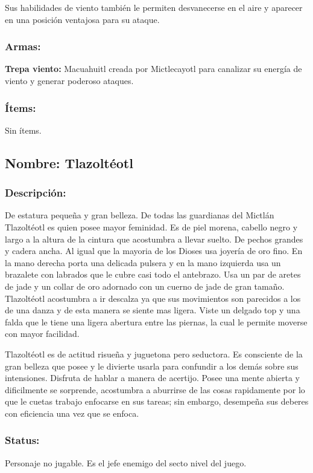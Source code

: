 \documentclass[11pt,letterpaper]{article}
\begin{document}
Sus habilidades de viento también le permiten desvanecerse en el aire y aparecer en una posición ventajosa para su ataque.
\subsubsection{Armas:}
\textbf{Trepa viento:} Macuahuitl creada por Mictlecayotl para canalizar su energía de viento y generar poderoso ataques.
\subsubsection{Ítems:}
Sin ítems.

\subsection{Nombre: Tlazoltéotl}  \label{per.tlazolteotl}
\subsubsection{Descripción: }  
De estatura pequeña y gran belleza. De todas las guardianas del Mictlán Tlazoltéotl es quien posee mayor feminidad. Es de piel morena, cabello negro y largo a la altura de la cintura que acostumbra a llevar suelto. De pechos grandes y cadera ancha. Al igual que la mayoria de los Dioses usa joyería de oro fino. En la mano derecha porta una delicada pulsera y en la mano izquierda usa un brazalete con labrados que le cubre casi todo el antebrazo. Usa un par de aretes de jade y un collar de oro adornado con un cuerno de jade de gran tamaño. Tlazoltéotl acostumbra a ir descalza ya que sus movimientos son parecidos a los de una danza y de esta manera se siente mas ligera. Viste un delgado top y una falda que le tiene una ligera abertura entre las piernas, la cual le permite moverse con mayor facilidad.
\\
\par
Tlazoltéotl es de actitud risueña y juguetona pero seductora. Es consciente de la gran belleza que posee y le divierte usarla para confundir a los demás sobre sus intensiones. Disfruta de hablar a manera de acertijo. Posee una mente abierta y dificilmente se sorprende, acostumbra a aburrirse de las cosas rapidamente por lo que le cuetas trabajo enfocarse en sus tareas; sin embargo, desempeña sus deberes con eficiencia una vez que se enfoca.    
\subsubsection{Status:}
Personaje no jugable.
Es el jefe enemigo del secto nivel del juego.
\end{document}
